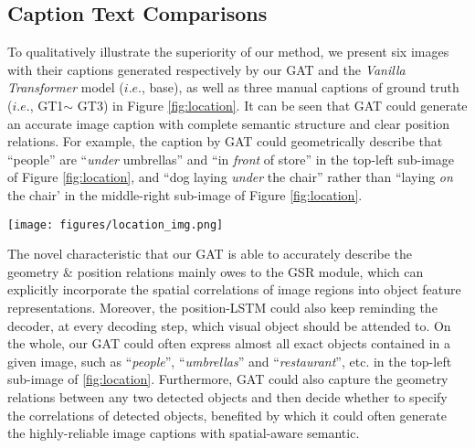 \documentclass[review]{elsarticle}
\begin{document}
\subsection{Caption Text Comparisons}
To qualitatively illustrate the superiority of our method, we present six images with their captions generated respectively by our GAT and the \emph{Vanilla Transformer} model ($i.e.$, base), as well as three manual captions of ground truth ($i.e.$, GT1$\sim$ GT3) in Figure \ref{fig:location}. It can be seen that GAT could generate an accurate image caption with complete semantic structure and clear position relations. For example, the caption by GAT could geometrically describe that ``people'' are ``\textit{under} umbrellas'' and ``in \textit{front} of store'' in the top-left sub-image of Figure \ref{fig:location}, and ``dog laying \textit{under} the chair'' rather than ``laying \emph{on} the chair' in the middle-right sub-image of Figure \ref{fig:location}.

\begin{figure*}[htb]
  \begin{center}
    \texttt{[image: figures/location\_img.png]}
  \end{center}
  \caption{The output comparison of captions generated respectively by our GAT and a base model, as well as three manual description captions of ground truth, GT1$\sim$GT3.}
  \label{fig:location}
\end{figure*}




The novel characteristic that our GAT is able to accurately describe the geometry \& position relations mainly owes to the GSR module, which can explicitly incorporate the spatial correlations of image regions into object feature representations. Moreover, the position-LSTM could also keep reminding the decoder, at every decoding step, which visual object should be attended to. On the whole, our GAT could often express almost all exact objects contained in a given image, such as ``\emph{people}'', ``\emph{umbrellas}'' and ``\emph{restaurant}'', etc. in the top-left sub-image of \ref{fig:location}. Furthermore, GAT could also capture the geometry relations between any two detected objects and then decide whether to specify the correlations of detected objects, benefited by which it could often generate the highly-reliable image captions with spatial-aware semantic.
\end{document}
